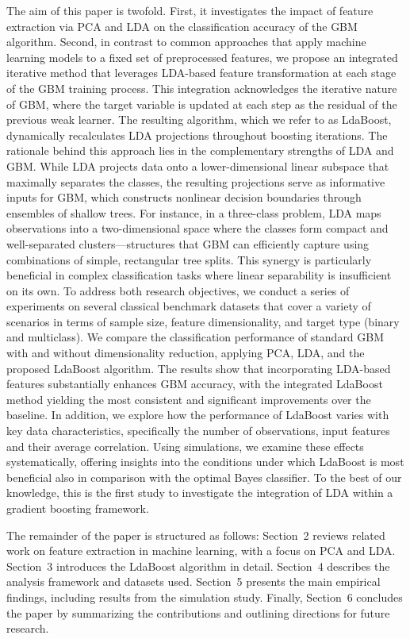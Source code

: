 \documentclass[11pt,a4paper]{article}
\begin{document}
The aim of this paper is twofold. First, it investigates the impact of feature extraction via PCA and LDA on the classification accuracy of the GBM algorithm. Second, in contrast to common approaches that apply machine learning models to a fixed set of preprocessed features, we propose an integrated iterative method that leverages LDA-based feature transformation at each stage of the GBM training process. This integration acknowledges the iterative nature of GBM, where the target variable is updated at each step as the residual of the previous weak learner. The resulting algorithm, which we refer to as LdaBoost, dynamically recalculates LDA projections throughout boosting iterations.
The rationale behind this approach lies in the complementary strengths of LDA and GBM. While LDA projects data onto a lower-dimensional linear subspace that maximally separates the classes, the resulting projections serve as informative inputs for GBM, which constructs nonlinear decision boundaries through ensembles of shallow trees. For instance, in a three-class problem, LDA maps observations into a two-dimensional space where the classes form compact and well-separated clusters---structures that GBM can efficiently capture using combinations of simple, rectangular tree splits. This synergy is particularly beneficial in complex classification tasks where linear separability is insufficient on its own.
To address both research objectives, we conduct a series of experiments on several classical benchmark datasets that cover a variety of scenarios in terms of sample size, feature dimensionality, and target type (binary and multiclass). We compare the classification performance of standard GBM with and without dimensionality reduction, applying PCA, LDA, and the proposed LdaBoost algorithm. The results show that incorporating LDA-based features substantially enhances GBM accuracy, with the integrated LdaBoost method yielding the most consistent and significant improvements over the baseline.
In addition, we explore how the performance of LdaBoost varies with key data characteristics, specifically the number of observations, input features and their average correlation. Using simulations, we examine these effects systematically, offering insights into the conditions under which LdaBoost is most beneficial also in comparison with the optimal Bayes classifier. To the best of our knowledge, this is the first study to investigate the integration of LDA within a gradient boosting framework.

The remainder of the paper is structured as follows: Section~2 reviews related work on feature extraction in machine learning, with a focus on PCA and LDA. Section~3 introduces the LdaBoost algorithm in detail. Section~4 describes the analysis framework and datasets used. Section~5 presents the main empirical findings, including results from the simulation study. Finally, Section~6 concludes the paper by summarizing the contributions and outlining directions for future research.
\end{document}
